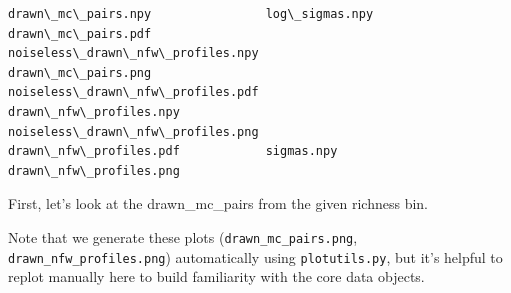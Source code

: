 \documentclass[11pt]{article}
\begin{document}
    \begin{Verbatim}[commandchars=\\\{\}]
drawn\_mc\_pairs.npy                log\_sigmas.npy
drawn\_mc\_pairs.pdf                noiseless\_drawn\_nfw\_profiles.npy
drawn\_mc\_pairs.png                noiseless\_drawn\_nfw\_profiles.pdf
drawn\_nfw\_profiles.npy            noiseless\_drawn\_nfw\_profiles.png
drawn\_nfw\_profiles.pdf            sigmas.npy
drawn\_nfw\_profiles.png
    \end{Verbatim}

    First, let's look at the drawn\_mc\_pairs from the given richness bin.

Note that we generate these plots (\texttt{drawn\_mc\_pairs.png},
\texttt{drawn\_nfw\_profiles.png}) automatically using
\texttt{plotutils.py}, but it's helpful to replot manually here to build
familiarity with the core data objects.
\end{document}
